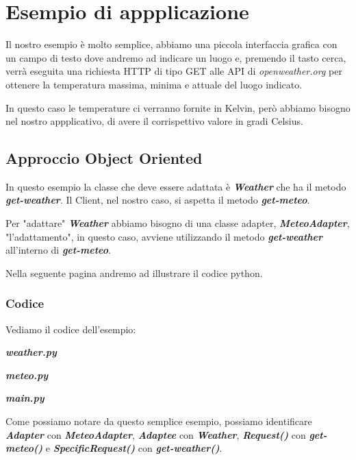 \chapter{Esempio di appplicazione}

  Il nostro esempio è molto semplice, abbiamo una piccola interfaccia grafica
  con un campo di testo dove andremo ad indicare un luogo e, premendo il tasto
  cerca, verrà eseguita una richiesta HTTP di tipo GET alle API di \textit{openweather.org}
  per ottenere la temperatura massima, minima e attuale del luogo indicato.
  
  In questo caso le temperature ci verranno fornite in Kelvin, però abbiamo
  bisogno nel nostro appplicativo, di avere il corrispettivo valore in gradi
  Celsius.
  
  \section{Approccio Object Oriented}
  
  In questo esempio la classe che deve essere adattata è \textbf{\textit{Weather}} che ha il
  metodo 
  \textbf{\textit{get-weather}}. Il Client, nel nostro caso, 
  si aspetta il metodo \textbf{\textit{get-meteo}}.
  
  Per "adattare" \textbf{\textit{Weather}} abbiamo bisogno di una classe adapter,
  \textbf{\textit{MeteoAdapter}}, "l'adattamento", in questo caso, 
  avviene utilizzando il metodo \textbf{\textit{get-weather}} all'interno di 
  \textbf{\textit{get-meteo}}.
  
  Nella seguente pagina andremo ad illustrare il codice python.
  \newpage
  
  \subsection{Codice}
  
  Vediamo il codice dell'esempio:
  
  \textbf{\textit{weather.py}}
  
  
  \textbf{\textit{meteo.py}}
  
  
  \textbf{\textit{main.py}}
  
  
  Come possiamo notare da questo semplice esempio, possiamo identificare
  \textbf{\textit{Adapter}} con \textbf{\textit{MeteoAdapter}}, 
  \textbf{\textit{Adaptee}} con \textbf{\textit{Weather}},
  \textbf{\textit{Request()}} con \textbf{\textit{get-meteo()}} e 
  \textbf{\textit{SpecificRequest()}} con \textbf{\textit{get-weather()}}.
  
